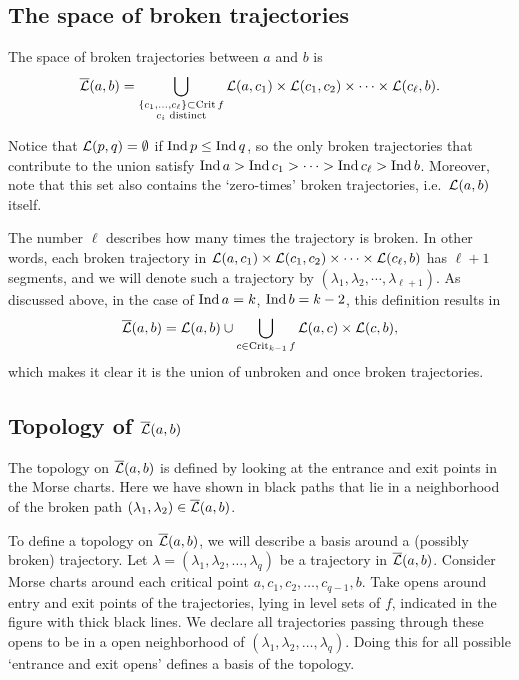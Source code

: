 \subsection{The space of broken trajectories}
\begin{definition}
    The space of broken trajectories between $a$ and  $b$ is
     \[
         \overline{\mathcal L}(a, b) = \bigcup_{\substack{\{c_1, \ldots, c_\ell\} \subset \operatorname{Crit} f\\ c_i \text{ distinct}}} \mathcal L(a, c_1) \times \mathcal L(c_1, c_2) \times  \cdots \times \mathcal L(c_\ell, b)
    .\] 
\end{definition}
\begin{remark}
    Notice that $\mathcal L(p, q) = \emptyset$ if $\operatorname{Ind} p \le \operatorname{Ind} q$, so the only broken trajectories that contribute to the union satisfy $\operatorname{Ind} a > \operatorname{Ind} c_1 > \cdots >\operatorname{Ind} c_\ell > \operatorname{Ind} b$.
    Moreover, note that this set also contains the `zero-times' broken trajectories,  i.e.\ $\mathcal L(a, b)$ itself.
\end{remark}
    The number $\ell$ describes how many times the trajectory is broken.
    In other words, each broken trajectory in $\mathcal L(a, c_1) \times \mathcal L(c_1, c_2) \times  \cdots \times \mathcal L(c_\ell, b)$ has $ \ell+1$ segments,  and we will denote such a trajectory by $(\lambda_1, \lambda_2, \cdots, \lambda_{\ell+1})$.
    As discussed above, in the case of $\operatorname{Ind} a = k$, $\operatorname{Ind} b = k -2$, this definition results in 
    \[
        \overline{\mathcal L}(a, b) = \mathcal L(a, b) \cup  \bigcup_{c \in \operatorname{Crit}_{k-1} f}  \mathcal L(a, c) \times \mathcal L(c, b)
    ,\] 
    which makes it clear it is the union of unbroken and once broken trajectories.

\subsection{Topology of $\overline{\mathcal L}(a, b)$}


\begin{marginfigure}
    \centering
    \caption{The topology on $\overline{\mathcal L}(a, b) $ is defined by looking at the entrance and exit points in the Morse charts.
        Here we have shown in black paths that lie in a neighborhood of the broken path $(\lambda_1, \lambda_2) \in \overline{\mathcal L}(a, b)$.
    }
    \label{fig:morse-homology-definition-of-topology}
\end{marginfigure}
To define a topology on $\overline{\mathcal L}(a, b)$,
we will describe a basis around a (possibly broken) trajectory.
Let $\lambda = (\lambda_1, \lambda_2, \ldots, \lambda_q)$ be a trajectory in $\overline{\mathcal L}(a, b)$.
Consider Morse charts around each critical point  $a, c_1, c_2, \ldots, c_{q-1}, b$.
Take opens around entry and exit points of the trajectories, lying in level sets of $f$, indicated in the figure with thick black lines.
We declare all trajectories passing through these opens to be in a open neighborhood of $(\lambda_1, \lambda_2, \ldots, \lambda_q)$.
Doing this for all possible `entrance and exit opens' defines a basis of the topology.

